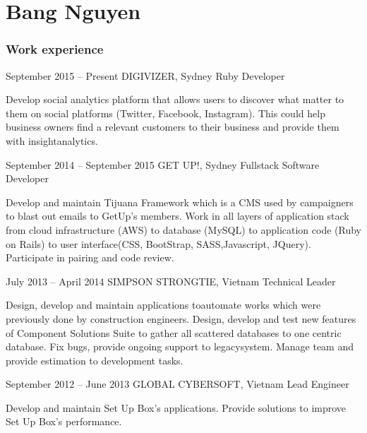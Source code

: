 \documentclass{tccv}
\begin{document}
\part{Bang Nguyen}

\section{Work experience}

\begin{eventlist}

\item{September 2015 -- Present}
     {DIGIVIZER, Sydney}
     {Ruby Developer}

Develop social analytics platform that allows users to discover
what matter to them on social platforms (Twitter, Facebook, Instagram).
This could help business owners find a relevant customers
to their business and provide them with insight\newline analytics.

\item{September 2014 -- September 2015}
     {GET UP!, Sydney}
     {Fullstack Software Developer}

Develop and maintain Tijuana Framework which is a CMS
used by campaigners to blast out emails to GetUp's members.
Work in all layers of application stack from cloud infrastructure (AWS)
to database (MySQL) to application code (Ruby on Rails)
to user interface(CSS, BootStrap, SASS,\newline Javascript, JQuery).
Participate in pairing and code review.

\item{July 2013 -- April 2014}
     {SIMPSON STRONGTIE, Vietnam}
     {Technical Leader}

Design, develop and maintain applications to\newline automate works which were previously done by construction engineers.
Design, develop and test new features of Component Solutions Suite to gather all scattered databases to one centric database.
Fix bugs, provide ongoing support to legacy\newline system.
Manage team and provide estimation to development tasks.

\item{September 2012 -- June 2013}
     {GLOBAL CYBERSOFT, Vietnam}
     {Lead Engineer}

Develop and maintain Set Up Box's applications.
Provide solutions to improve Set Up Box's performance.


\end{eventlist}
\end{document}
